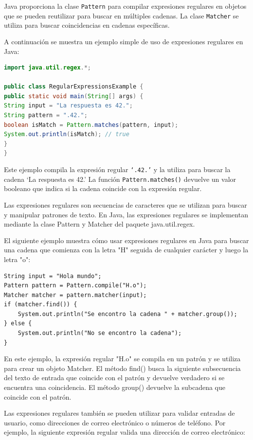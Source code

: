 \documentclass[executivepaper]{article}
\begin{document}
Java proporciona la clase \texttt{Pattern} para compilar expresiones regulares en objetos que se pueden reutilizar para buscar en múltiples cadenas. La clase \texttt{Matcher} se utiliza para buscar coincidencias en cadenas específicas.

A continuación se muestra un ejemplo simple de uso de expresiones regulares en Java:

\begin{lstlisting}[language=Java]
import java.util.regex.*;

public class RegularExpressionsExample {
public static void main(String[] args) {
String input = "La respuesta es 42.";
String pattern = ".42.";
boolean isMatch = Pattern.matches(pattern, input);
System.out.println(isMatch); // true
}
}
\end{lstlisting}

Este ejemplo compila la expresión regular \texttt{\enquote*{.42.}} y la utiliza para buscar la cadena \enquote*{La respuesta es 42.} La función \texttt{Pattern.matches()} devuelve un valor booleano que indica si la cadena coincide con la expresión regular.

Las expresiones regulares son secuencias de caracteres que se utilizan para buscar y manipular patrones de texto. En Java, las expresiones regulares se implementan mediante la clase Pattern y Matcher del paquete java.util.regex.

El siguiente ejemplo muestra cómo usar expresiones regulares en Java para buscar una cadena que comienza con la letra "H" seguida de cualquier carácter y luego la letra "o":

\begin{lstlisting}
String input = "Hola mundo";
Pattern pattern = Pattern.compile("H.o");
Matcher matcher = pattern.matcher(input);
if (matcher.find()) {
    System.out.println("Se encontro la cadena " + matcher.group());
} else {
    System.out.println("No se encontro la cadena");
}
\end{lstlisting}

En este ejemplo, la expresión regular "H.o" se compila en un patrón y se utiliza para crear un objeto Matcher. El método find() busca la siguiente subsecuencia del texto de entrada que coincide con el patrón y devuelve verdadero si se encuentra una coincidencia. El método group() devuelve la subcadena que coincide con el patrón.

Las expresiones regulares también se pueden utilizar para validar entradas de usuario, como direcciones de correo electrónico o números de teléfono. Por ejemplo, la siguiente expresión regular valida una dirección de correo electrónico:
\end{document}
